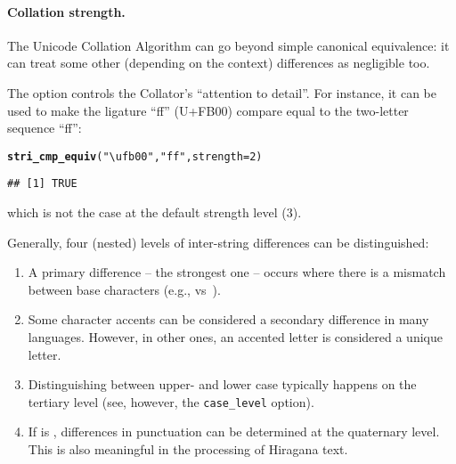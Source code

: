 \documentclass[nojss]{jss}\usepackage[]{graphicx}\usepackage[]{xcolor}
\makeatletter
\newcommand{\hlnum}[1]{\textcolor[rgb]{0.686,0.059,0.569}{#1}}%
\newcommand{\hlstr}[1]{\textcolor[rgb]{0.192,0.494,0.8}{#1}}%
\newcommand{\hlstd}[1]{\textcolor[rgb]{0.345,0.345,0.345}{#1}}%
\newcommand{\hlkwc}[1]{\textcolor[rgb]{0.333,0.667,0.333}{#1}}%
\newcommand{\hlkwd}[1]{\textcolor[rgb]{0.737,0.353,0.396}{\textbf{#1}}}%
\newenvironment{kframe}{%
 \def\at@end@of@kframe{}%
 \ifinner\ifhmode%
  \def\at@end@of@kframe{\end{minipage}}%
  \begin{minipage}{\columnwidth}%
 \fi\fi%
 \def\FrameCommand##1{\hskip\@totalleftmargin \hskip-\fboxsep
 \colorbox{shadecolor}{##1}\hskip-\fboxsep
     \hskip-\linewidth \hskip-\@totalleftmargin \hskip\columnwidth}%
 \MakeFramed {\advance\hsize-\width
   \@totalleftmargin\z@ \linewidth\hsize
   \@setminipage}}%
 {\par\unskip\endMakeFramed%
 \at@end@of@kframe}
\newenvironment{knitrout}{}{} %
\makeatother
\begin{document}
\paragraph{Collation strength.}
The Unicode Collation Algorithm \citep{uts10:collation}
can go beyond simple canonical equivalence:
it can treat some other (depending on the context)
differences as negligible too.

The  option controls the Collator's ``attention to detail''.
For instance, it can be used to make the ligature ``ff'' (U+FB00)
compare equal to the two-letter sequence ``f{}f'':

\begin{knitrout}
\color{fgcolor}\begin{kframe}
\begin{alltt}
\hlkwd{stri_cmp_equiv}\hlstd{(}\hlstr{"\textbackslash{}ufb00"}\hlstd{,} \hlstr{"ff"}\hlstd{,} \hlkwc{strength}\hlstd{=}\hlnum{2}\hlstd{)}
\end{alltt}
\begin{verbatim}
## [1] TRUE
\end{verbatim}
\end{kframe}
\end{knitrout}

\noindent
which is not the case at the default strength level (3).




Generally, four (nested) levels of inter-string differences can be distinguished:
\begin{enumerate}
\item A primary difference -- the strongest one -- occurs where
there is a mismatch between base characters (e.g.,  vs~).

\item Some character accents can be considered a secondary difference
in many languages. However, in other ones, an accented letter is considered
a unique letter.

\item Distinguishing between upper- and lower case typically happens
on the tertiary level (see, however, the \texttt{case\_level} option).


\item If  is ,
differences in punctuation
can be determined at the quaternary level. This is also meaningful
in the processing of Hiragana text.


\end{enumerate}
\end{document}
